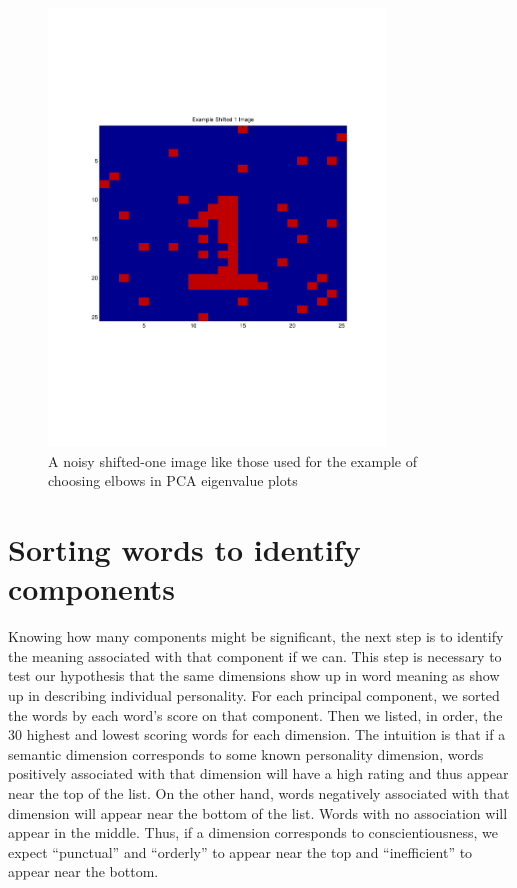 \documentclass[10pt,letterpaper]{book}
\begin{document}
\begin{figure}[h]
  \centering
  \includegraphics[trim=1.0in 3in 1.0in 2.7in,clip,width=0.8\textwidth]{shift_1_pca_example/shifted_1_image_example}
  \caption{A noisy shifted-one image like those used for the example of choosing elbows in PCA eigenvalue plots}
  \label{fig:shifted_1_image_example}
\end{figure}

\section{Sorting words to identify components}

Knowing how many components might be significant, the next step is to identify the meaning associated with that component if we can. This step is necessary to test our hypothesis that the same dimensions show up in word meaning as show up in describing individual personality. For each principal component, we sorted the words by each word's score on that component. Then we listed, in order, the 30 highest and lowest scoring words for each dimension. The intuition is that if a semantic dimension corresponds to some known personality dimension, words positively associated with that dimension will have a high rating and thus appear near the top of the list. On the other hand, words negatively associated with that dimension will appear near the bottom of the list. Words with no association will appear in the middle. Thus, if a dimension corresponds to conscientiousness, we expect ``punctual'' and ``orderly'' to appear near the top and ``inefficient'' to appear near the bottom.
\end{document}
